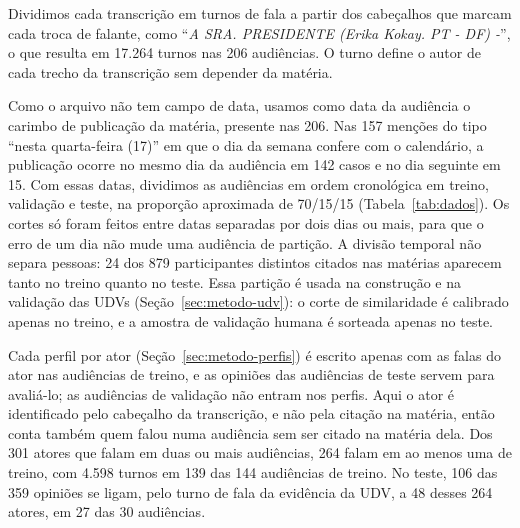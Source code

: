 Dividimos cada transcrição em turnos de fala a partir dos cabeçalhos que marcam cada troca de
falante, como ``\textit{A SRA. PRESIDENTE (Erika Kokay. PT - DF) -}'', o que resulta em 17.264 turnos
nas 206 audiências. O turno define o autor de
cada trecho da transcrição sem depender da matéria.

Como o arquivo não tem campo de data, usamos como data da audiência o carimbo de publicação da
matéria, presente nas 206. Nas 157
menções do tipo ``nesta quarta-feira (17)'' em que o dia da semana confere com o calendário, a
publicação ocorre no mesmo dia da audiência em 142 casos e no dia seguinte em 15. Com essas datas,
dividimos as audiências em ordem cronológica em treino, validação e teste, na proporção aproximada de
70/15/15 (Tabela~\ref{tab:dados}). Os cortes só foram feitos entre datas separadas por dois dias ou
mais, para que o erro de um dia não mude uma audiência de partição. A divisão temporal não separa
pessoas: 24 dos 879 participantes distintos citados nas matérias aparecem tanto no treino quanto no
teste. Essa partição é usada na construção e na validação das UDVs (Seção~\ref{sec:metodo-udv}): o corte
de similaridade é calibrado apenas no treino, e a amostra de validação humana é sorteada apenas no
teste.

Cada perfil por ator (Seção~\ref{sec:metodo-perfis}) é escrito apenas com as falas do ator nas
audiências de treino, e as opiniões das audiências de teste servem para avaliá-lo; as audiências de
validação não entram nos perfis. Aqui o ator é identificado pelo cabeçalho da
transcrição, e não pela citação na matéria, então conta também quem falou numa audiência sem ser
citado na matéria dela. Dos 301 atores que falam em duas ou mais audiências, 264 falam em ao menos uma
de treino, com 4.598 turnos em 139 das 144 audiências de treino. No teste, 106 das 359 opiniões se
ligam, pelo turno de fala da evidência da UDV, a 48 desses 264 atores, em 27 das 30 audiências.


